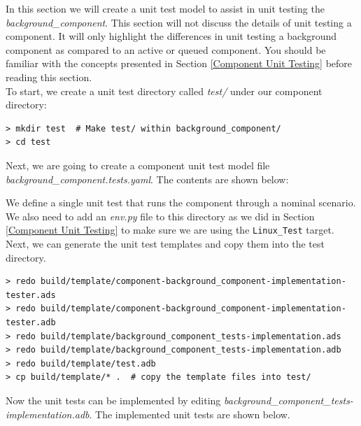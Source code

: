 In this section we will create a unit test model to assist in unit testing the \textit{background\_component}. This section will not discuss the details of unit testing a component. It will only highlight the differences in unit testing a background component as compared to an active or queued component. You should be familiar with the concepts presented in Section \ref{Component Unit Testing} before reading this section. \\

To start, we create a unit test directory called \textit{test/} under our component directory:

\vspace{5mm} %
\begin{verbatim}
> mkdir test  # Make test/ within background_component/
> cd test
\end{verbatim}
\vspace{5mm} %

Next, we are going to create a component unit test model file \textit{background\_component.tests.yaml}. The contents are shown below:


We define a single unit test that runs the component through a nominal scenario. \\

We also need to add an \textit{env.py} file to this directory as we did in Section \ref{Component Unit Testing} to make sure we are using the \texttt{Linux\_Test} target. \\

Next, we can generate the unit test templates and copy them into the test directory.

\vspace{5mm} %
\begin{verbatim}
> redo build/template/component-background_component-implementation-tester.ads
> redo build/template/component-background_component-implementation-tester.adb
> redo build/template/background_component_tests-implementation.ads
> redo build/template/background_component_tests-implementation.adb
> redo build/template/test.adb
> cp build/template/* .  # copy the template files into test/
\end{verbatim}
\vspace{5mm} %

Now the unit tests can be implemented by editing \textit{background\_component\_tests-implementation.adb}. The implemented unit tests are shown below. \\

